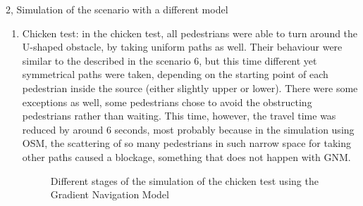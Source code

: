 \documentclass[10pt,a4paper]{article}
\begin{document}
\begin{task}{2, Simulation of the scenario with a different model}
\begin{enumerate}[label=(\alph*)]
    \item Chicken test: in the chicken test, all pedestrians were able to turn around the U-shaped obstacle, by taking uniform paths as well. Their behaviour were similar to the described in the scenario 6, but this time different yet symmetrical paths were taken, depending on the starting point of each pedestrian inside the source (either slightly upper or lower). There were some exceptions as well, some pedestrians chose to avoid the obstructing pedestrians rather than waiting. This time, however, the travel time was reduced by around 6 seconds, most probably because in the simulation using OSM, the scattering of so many pedestrians in such narrow space for taking other paths caused a blockage, something that does not happen with GNM.
    
    \begin{figure} [H]
    \centering
        \caption{Different stages of the simulation of the chicken test using the Gradient Navigation Model}
        \label{chicken_gnm}
    \end{figure}
    

\end{enumerate}
\end{task}
\end{document}

